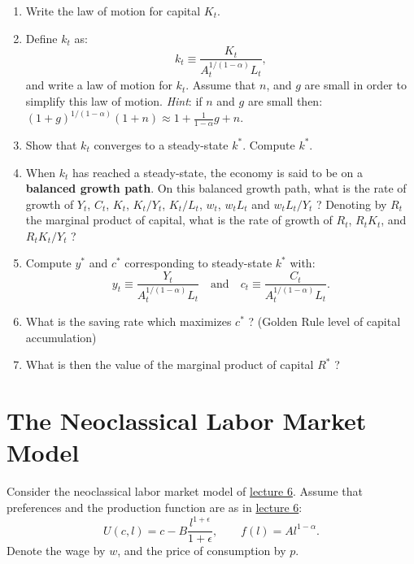 \documentclass[]{book}
\begin{document}
\begin{enumerate}
\def\labelenumi{\arabic{enumi}.}
\item
  Write the law of motion for capital \(K_t\).
\item
  Define \(k_t\) as: \[ k_t\equiv\frac{K_t}{A_t^{1/(1-\alpha)} L_t},\]
  and write a law of motion for \(k_t\). Assume that \(n\), and \(g\)
  are small in order to simplify this law of motion. \emph{Hint}: if
  \(n\) and \(g\) are small then:
  \((1+g)^{1/(1-\alpha)}(1+n) \approx 1+\frac{1}{1-\alpha}g+n.\)
\item
  Show that \(k_t\) converges to a steady-state \(k^{*}\). Compute
  \(k^{*}\).
\item
  When \(k_t\) has reached a steady-state, the economy is said to be on
  a \textbf{balanced growth path}. On this balanced growth path, what is
  the rate of growth of \(Y_t\), \(C_t\), \(K_t\), \(K_t/Y_t\),
  \(K_t/L_t\), \(w_t\), \(w_t L_t\) and \(w_t L_t/Y_t\) ? Denoting by
  \(R_t\) the marginal product of capital, what is the rate of growth of
  \(R_t\), \(R_t K_t\), and \(R_t K_t/Y_t\) ?
\item
  Compute \(y^{*}\) and \(c^{*}\) corresponding to steady-state
  \(k^{*}\) with:
  \[y_t \equiv \frac{Y_t}{A_t^{1/(1-\alpha)} L_t} \quad \text{and} \quad c_t \equiv \frac{C_t}{A_t^{1/(1-\alpha)} L_t}.\]
\item
  What is the saving rate which maximizes \(c^{*}\) ? (Golden Rule level
  of capital accumulation)
\item
  What is then the value of the marginal product of capital \(R^{*}\) ?
\end{enumerate}

\section{The Neoclassical Labor Market
Model}\label{the-neoclassical-labor-market-model}

Consider the neoclassical labor market model of
\protect\hyperlink{labor-market}{lecture 6}. Assume that preferences and
the production function are as in
\protect\hyperlink{labor-market}{lecture 6}:
\[U(c, l)=c-B\frac{l^{1+\epsilon}}{1+\epsilon}, \qquad f(l)=Al^{1-\alpha}.\]
Denote the wage by \(w\), and the price of consumption by \(p\).
\end{document}
